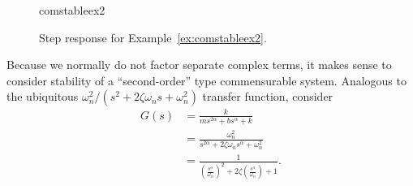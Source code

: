 \begin{figure}
  \centering
  {comstableex2}
  \caption{Step response for Example~\ref{ex:comstableex2}.}
  \label{fig:comstableex2}
\end{figure}

Because we normally do not factor separate complex terms, it makes sense to consider stability of a ``second-order'' type commensurable system. Analogous to the ubiquitous $\omega_n^2/\left( s^2 + 2 \zeta \omega_n s + \omega_n^2 \right)$ transfer function, consider
\begin{align}
  G(s) &= \frac{k}{m s^{2 \alpha} + b s^\alpha + k} \nonumber \\
  &= \frac{\omega_n^2}{s^{2 \alpha} + 2 \zeta \omega_n s^\alpha + \omega_n^2} \nonumber \\
  &= \frac{1}{\left( \frac{s^\alpha}{\omega_n} \right)^2 + 2 \zeta \left( \frac{s^\alpha}{\omega_n} \right) + 1}. \label{eq:secondcommensurable}
\end{align}

